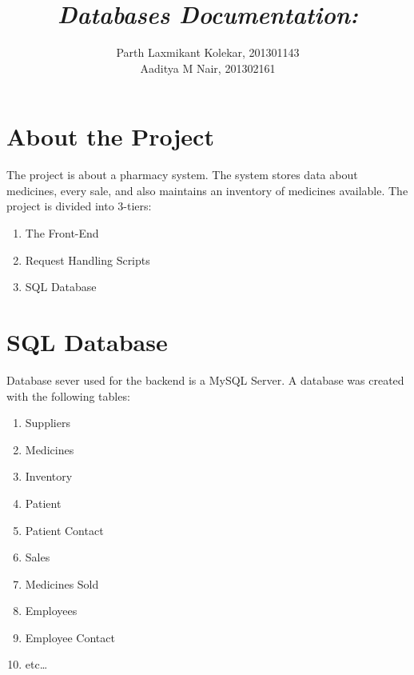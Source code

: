 \documentclass[14pt, a4paper]{extarticle}
\title{\emph{\textbf{Databases Documentation}:}}
\author{Parth Laxmikant Kolekar, 201301143\\
Aaditya M Nair, 201302161 }
\begin{document}
    \maketitle

    \section{About the Project}
        The project is about a pharmacy system. The system stores data about 
        medicines, every sale, and also maintains an inventory of medicines 
        available. The project is divided into 3-tiers:
        \begin{enumerate}
                \item The Front-End \\
                \item Request Handling Scripts \\
                \item SQL Database \\
        \end{enumerate}

    \section{SQL Database}
        Database sever used for the backend is a MySQL Server. A database was created 
        with the following tables:
        \begin{enumerate}
                \item Suppliers \\
                \item Medicines \\
                \item Inventory \\
                \item Patient \\
                \item Patient Contact \\
                \item Sales \\
                \item Medicines Sold \\
                \item Employees \\
                \item Employee Contact \\
                \item etc\ldots \\
        \end{enumerate}
\end{document}
